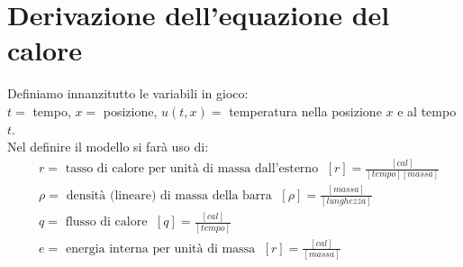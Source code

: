 \section{Derivazione dell'equazione del calore}
Definiamo innanzitutto le variabili in gioco:\\
$t=$ tempo, $x=$ posizione, $u(t,x)=$ temperatura nella posizione $x$ e al tempo $t$.\\
Nel definire il modello si far\`a uso di:
%
\begin{align*}
& r= \mbox{ tasso di calore per unit\`a di massa dall'esterno } \; [r]=\frac{[cal]}{[tempo][massa]}\\
& \rho= \mbox{ densit\`a (lineare) di massa della barra } \; [\rho]=\frac{[massa]}{[lunghezza]}\\
& q= \mbox{ flusso di calore } \; [q]=\frac{[cal]}{[tempo]}\\
& e= \mbox{ energia interna per unit\`a di massa } \; [r]=\frac{[cal]}{[massa]}\\
\end{align*}

